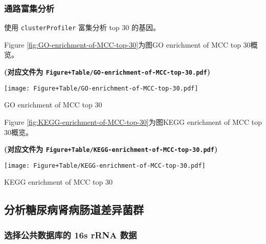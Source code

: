 \documentclass[
]{article}
\begin{document}
\hypertarget{ux901aux8defux5bccux96c6ux5206ux6790}{%
\subsubsection{通路富集分析}\label{ux901aux8defux5bccux96c6ux5206ux6790}}

使用 \texttt{clusterProfiler} 富集分析 top 30 的基因。

Figure \ref{fig:GO-enrichment-of-MCC-top-30}为图GO enrichment of MCC top 30概览。

\textbf{(对应文件为 \texttt{Figure+Table/GO-enrichment-of-MCC-top-30.pdf})}

\def\@captype{figure}
\begin{center}
\texttt{[image: Figure+Table/GO-enrichment-of-MCC-top-30.pdf]}
\caption{GO enrichment of MCC top 30}\label{fig:GO-enrichment-of-MCC-top-30}
\end{center}

Figure \ref{fig:KEGG-enrichment-of-MCC-top-30}为图KEGG enrichment of MCC top 30概览。

\textbf{(对应文件为 \texttt{Figure+Table/KEGG-enrichment-of-MCC-top-30.pdf})}

\def\@captype{figure}
\begin{center}
\texttt{[image: Figure+Table/KEGG-enrichment-of-MCC-top-30.pdf]}
\caption{KEGG enrichment of MCC top 30}\label{fig:KEGG-enrichment-of-MCC-top-30}
\end{center}

\hypertarget{ux5206ux6790ux7cd6ux5c3fux75c5ux80beux75c5ux80a0ux9053ux5deeux5f02ux83ccux7fa4}{%
\subsection{分析糖尿病肾病肠道差异菌群}\label{ux5206ux6790ux7cd6ux5c3fux75c5ux80beux75c5ux80a0ux9053ux5deeux5f02ux83ccux7fa4}}

\hypertarget{ux9009ux62e9ux516cux5171ux6570ux636eux5e93ux7684-16s-rrna-ux6570ux636e}{%
\subsubsection{选择公共数据库的 16s rRNA 数据}\label{ux9009ux62e9ux516cux5171ux6570ux636eux5e93ux7684-16s-rrna-ux6570ux636e}}
\end{document}
